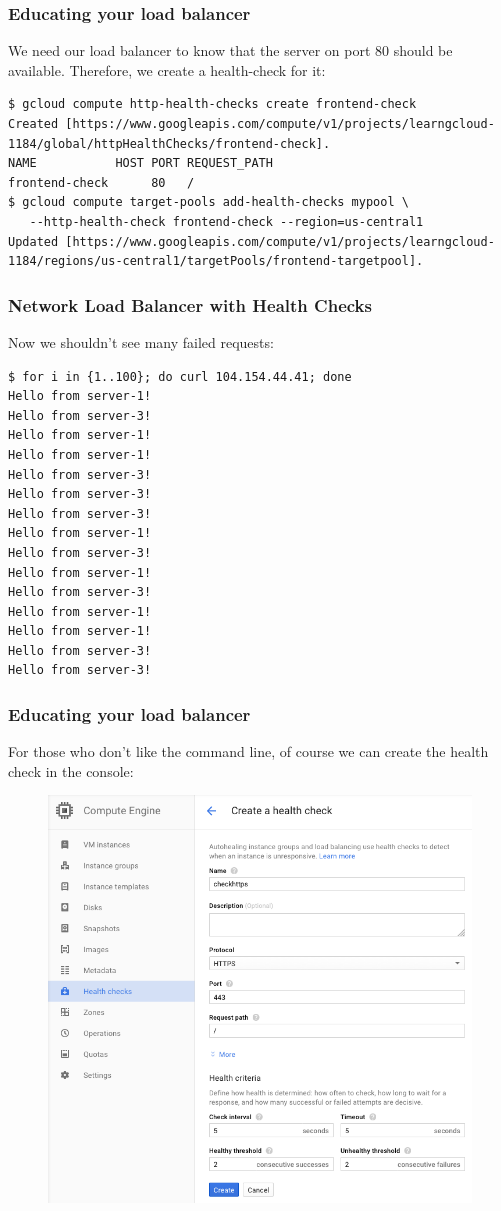 \documentclass[9pt]{beamer}
\begin{document}
\begin{frame}[fragile]
\frametitle{Educating your load balancer}
We need our load balancer to know that the server on port 80 should be available. Therefore, we create a health-check for it:
\begin{verbatim}
$ gcloud compute http-health-checks create frontend-check
Created [https://www.googleapis.com/compute/v1/projects/learngcloud-1184/global/httpHealthChecks/frontend-check].
NAME           HOST PORT REQUEST_PATH
frontend-check      80   /
$ gcloud compute target-pools add-health-checks mypool \
   --http-health-check frontend-check --region=us-central1
Updated [https://www.googleapis.com/compute/v1/projects/learngcloud-1184/regions/us-central1/targetPools/frontend-targetpool].
\end{verbatim}
\end{frame}

\begin{frame}[fragile]
\frametitle{Network Load Balancer with Health Checks}
Now we shouldn't see many failed requests:
\begin{verbatim}
$ for i in {1..100}; do curl 104.154.44.41; done
Hello from server-1!
Hello from server-3!
Hello from server-1!
Hello from server-1!
Hello from server-3!
Hello from server-3!
Hello from server-3!
Hello from server-1!
Hello from server-3!
Hello from server-1!
Hello from server-3!
Hello from server-1!
Hello from server-1!
Hello from server-3!
Hello from server-3!
\end{verbatim}
\end{frame}

\begin{frame}[fragile]
\frametitle{Educating your load balancer}
For those who don't like the command line, of course we can create the health check in the console:
\begin{figure}[fragile]
    \includegraphics[scale=0.3]{figures/HealthCheck.png}
\end{figure}
\end{frame}
\end{document}
